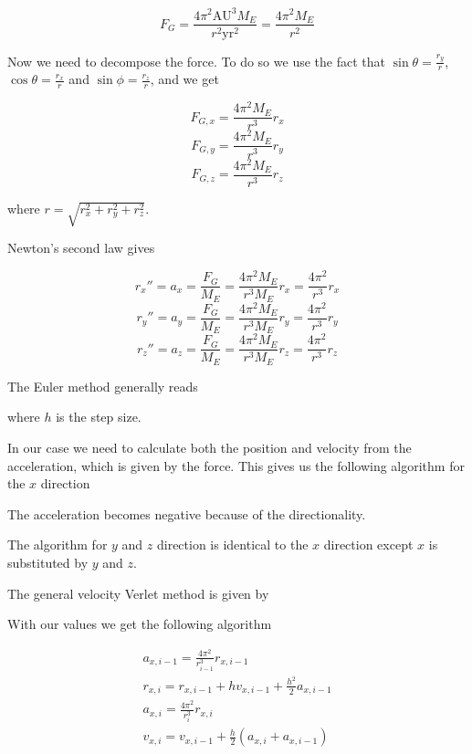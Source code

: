 \documentclass{article}
\begin{document}
$$F_G=\frac{4\pi^2\mathrm{AU}^3M_E}{r^2\mathrm{yr}^2}=\frac{4\pi^2M_E}{r^2}$$


Now we need to decompose the force. To do so we use the fact that $\sin \theta=\frac{r_y}{r}$, $\cos \theta=\frac{r_x}{r}$ and $\sin\phi=\frac{r_z}{r}$, and we get

$$F_{G,x}=\frac{4\pi^2M_E}{r^3}r_x$$
$$F_{G,y}=\frac{4\pi^2M_E}{r^3}r_y$$
$$F_{G,z}=\frac{4\pi^2M_E}{r^3}r_z$$

where $r=\sqrt{r_x^2+r_y^2+r_z^2}$.

Newton's second law gives

$$r_x''=a_x=\frac{F_G}{M_E}=\frac{4\pi^2M_E}{r^3M_E}r_x=\frac{4\pi^2}{r^3}r_x$$
$$r_y''=a_y=\frac{F_G}{M_E}=\frac{4\pi^2M_E}{r^3M_E}r_y=\frac{4\pi^2}{r^3}r_y$$
$$r_z''=a_z=\frac{F_G}{M_E}=\frac{4\pi^2M_E}{r^3M_E}r_z=\frac{4\pi^2}{r^3}r_z$$

\vskip0.5cm
The Euler method generally reads
\vskip0.5cm
\begin{algorithm}[H]
\end{algorithm}
\vskip0.5cm

where $h$ is the step size.

In our case we need to calculate both the position and velocity from the acceleration, which is given by the force. This gives us the following algorithm for the $x$ direction

\vskip0.5cm
\begin{algorithm}[H]
\end{algorithm}
\vskip0.5cm
The acceleration becomes negative because of the directionality.

The algorithm for $y$ and $z$ direction is identical to the $x$ direction except $x$ is substituted by $y$ and $z$.

\vskip0.7cm
The general velocity Verlet method is given by

\vskip0.5cm
\begin{algorithm}[H]
\end{algorithm}
\vskip0.5cm

With our values we get the following algorithm

\begin{equation*}
\begin{split}
a_{x,i-1}=\frac{4\pi^2}{r_{i-1}^3}r_{x,i-1}\\
r_{x,i}=r_{x,i-1}+hv_{x,i-1}+\frac{h^2}{2}a_{x,i-1}\\
a_{x,i}=\frac{4\pi^2}{r_i^3}r_{x,i}\\
v_{x,i}=v_{x,i-1}+\frac{h}{2}(a_{x,i}+a_{x,i-1})
\end{split}
\end{equation*}
\end{document}
